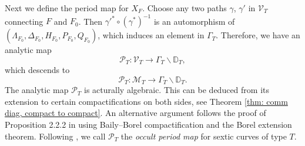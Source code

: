 \documentclass[12pt,reqno,a4paper]{amsart}
\theoremstyle{remark}
\theoremstyle{definition}
\newcommand{\DD}{\mathbb{D}}
\newcommand{\Prd}{\mathscr{P}}
\newcommand{\calM}{\mathcal{M}}
\newcommand{\calV}{\mathcal{V}}
\newcommand{\bs}{\backslash}
\begin{document}
Next we define the period map for $X_F$. Choose any two paths $\gamma$, $\gamma'$ in $\calV_T$ connecting $F$ and $F_0$.
Then $\gamma'^*\circ (\gamma^*)^{-1}$ is an automorphism of $(\Lambda_{F_0}, \Delta_{F_0}, H_{F_0}, P_{F_0}, Q_{F_0})$, which induces an element in $\Gamma_T$. Therefore, we have an analytic map
\[
\Prd_T\colon \calV_T\to \Gamma_T\bs \DD_T,
\]
which descends to 
\[
\Prd_T\colon \calM_T\to \Gamma_T\bs \DD_T.
\]
The analytic map $\Prd_T$ is acturally algebraic. This can be deduced from its extension to certain compactifications on both sides, see Theorem \ref{thm: comm diag, compact to compact}. An alternative argument follows the proof of Proposition 2.2.2 in \cite{hassett2000special} using Baily–Borel compactification and the Borel extension theorem.
Following \cite{kudla2012occult}, we call $\Prd_T$ the \emph{occult period map} for sextic curves of type $T$.
\end{document}
